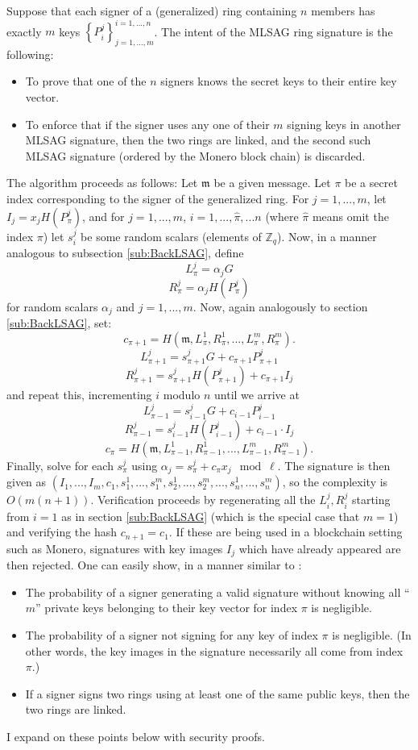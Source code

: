 \documentclass[12pt,english]{mrl}
\theoremstyle{definition}
\numberwithin{equation}{section}
\numberwithin{figure}{section}
\numberwithin{equation}{section}
\numberwithin{equation}{section}
\numberwithin{figure}{section}
\begin{document}
Suppose that each signer of a (generalized) ring containing $n$
members has exactly $m$ keys $\left\{ P_{i}^{j}\right\} _{j=1,...,m}^{i=1,...,n}$.
The intent of the MLSAG ring signature is the following: 
\begin{itemize}
\item To prove that one of the $n$ signers knows the secret keys to their entire key vector. 
\item To enforce that if the signer uses any one of their $m$ signing keys in another MLSAG
signature, then the two rings are linked, and the second such MLSAG signature (ordered by the Monero block chain) is discarded. 
\end{itemize}

The algorithm proceeds as follows: Let $\mathfrak{m}$ be a given
message. Let $\pi$ be a secret index corresponding to the signer
of the generalized ring. For $j=1,...,m$, let $I_{j}=x_{j}H\left(P_{\pi}^{j}\right)$,
and for $j=1,...,m$, $i=1,...,\hat{\pi},...n$ (where $\hat{\pi}$
means omit the index $\pi$) let $s_{i}^{j}$ be some random scalars (elements of $\mathbb{Z}_q$).
Now, in a manner analogous to subsection \ref{sub:BackLSAG},
define 
\[
L_{\pi}^{j}=\alpha_{j}G
\]
\[
R_{\pi}^{j}=\alpha_{j}H\left(P_{\pi}^{j}\right)
\]
 for random scalars $\alpha_j$ and $j=1,...,m$. Now, again analogously
to section \ref{sub:BackLSAG}, set:
\[
c_{\pi+1}=H\left(\mathfrak{m},L_{\pi}^{1},R_{\pi}^{1},...,L_{\pi}^{m},R_{\pi}^{m}\right).
\]
\[
L_{\pi+1}^{j}=s_{\pi+1}^{j}G+c_{\pi+1}P_{\pi+1}^{j}
\]
\[
R_{\pi+1}^{j}=s_{\pi+1}^{j}H\left(P_{\pi+1}^{j}\right)+c_{\pi+1}I_{j}
\]
 and repeat this, incrementing $i$ modulo $n$ until we arrive at
\[
L_{\pi-1}^{j}=s_{i-1}^{j}G+c_{i-1}P_{i-1}^{j}
\]
\[
R_{\pi-1}^{j}=s_{i-1}^{j}H\left(P_{i-1}^{j}\right)+c_{i-1}\cdot I_{j}
\]
\[
c_{\pi}=H\left(\mathfrak{m},L_{\pi-1}^{1},R_{\pi-1}^{1},...,L_{\pi-1}^{m},R_{\pi-1}^{m}\right).
\]
 Finally, solve for each $s_{\pi}^{j}$ using $\alpha_{j}=s_{\pi}^{j}+c_{\pi}x_{j} \mod \ell$.
The signature is then given as $\left(I_{1},...,I_{m},c_{1},s_{1}^{1},...,s_{1}^{m},s_{2}^{1},...,s_{2}^{m},...,s_{n}^{1},...,s_{n}^{m}\right)$,
so the complexity is $O\left(m\left(n+1\right)\right).$ 
Verification
proceeds by regenerating all the $L_{i}^{j},R_{i}^{j}$ starting from
$i=1$ as in section \ref{sub:BackLSAG} (which is the special case that $m=1$) and verifying
the hash $c_{n+1}=c_{1}.$ 
If these are being used in a blockchain setting such as Monero, signatures with key images $I_j$ which have already appeared are then rejected. 
One can easily show, in a manner similar to \cite{LWW}: 
\begin{itemize}
\item The probability of a signer generating a valid signature without knowing
all ``$m$'' private keys belonging to their key vector for index $\pi$ is negligible. 
\item The probability of a signer not signing for any key of index $\pi$
is negligible. (In other words, the key images in the signature necessarily
all come from index $\pi$.)
\item If a signer signs two rings using at least one of the same public keys, then the two rings are linked.
\end{itemize}
I expand on these points below with security proofs. 
\end{document}
